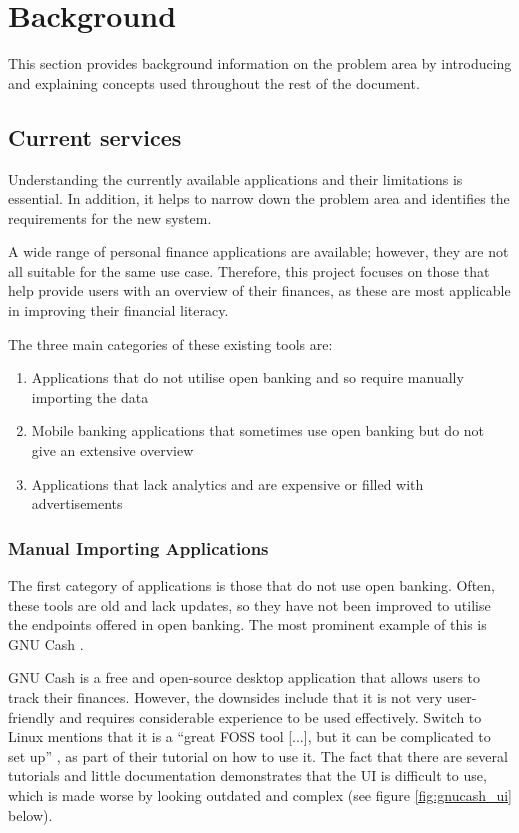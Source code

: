 \chapter{Background}
\label{ch:background}
This section provides background information on the problem area by introducing and explaining concepts used throughout the rest of the document.

\section{Current services}
\label{sec:current-services}
Understanding the currently available applications and their limitations is essential. In addition, it helps to narrow down the problem area and identifies the requirements for the new system.

A wide range of personal finance applications are available; however, they are not all suitable for the same use case. Therefore, this project focuses on those that help provide users with an overview of their finances, as these are most applicable in improving their financial literacy.

The three main categories of these existing tools are:
\begin{enumerate}
    \item Applications that do not utilise open banking and so require manually importing the data
    \item Mobile banking applications that sometimes use open banking but do not give an extensive overview
    \item Applications that lack analytics and are expensive or filled with advertisements
\end{enumerate}

\subsection{Manual Importing Applications}
\label{sec:manual-importing-applications}
The first category of applications is those that do not use open banking. Often, these tools are old and lack updates, so they have not been improved to utilise the endpoints offered in open banking. The most prominent example of this is GNU Cash \cite{GNUCash}.

GNU Cash is a free and open-source desktop application that allows users to track their finances. However, the downsides include that it is not very user-friendly and requires considerable experience to be used effectively. Switch to Linux mentions that it is a ``great FOSS tool [...], but it can be complicated to set up'' \cite{GNUCashSwitchedToLinux}, as part of their tutorial on how to use it. The fact that there are several tutorials and little documentation demonstrates that the UI is difficult to use, which is made worse by looking outdated and complex (see figure \ref{fig:gnucash_ui} below).

